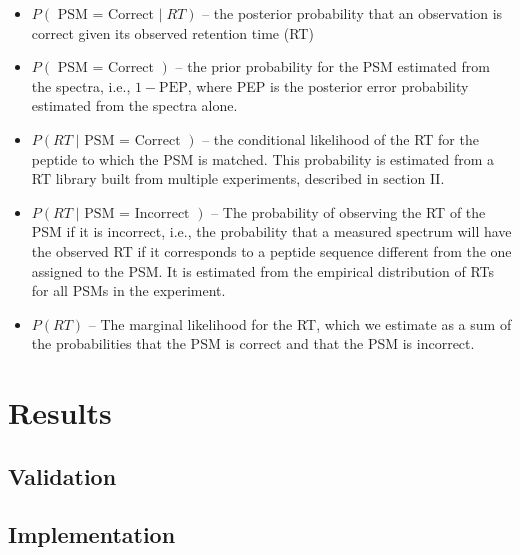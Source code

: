 \begin{spacing}{1.55}
\begin{itemize}
\item $P(\mbox{ PSM = Correct }|\;RT)$ -- the posterior probability that an observation is correct given its observed retention time (RT)
\item $P(\mbox{ PSM = Correct })$ -- the prior probability for the PSM estimated from the spectra, i.e., $1- \mbox{PEP}$, where PEP is the posterior error probability estimated from the spectra alone. 
\item $P(RT\; | \mbox{ PSM = Correct })$ -- the conditional likelihood of the RT for the peptide to which the PSM is matched. This probability is estimated from a RT library built from multiple experiments, described in section II. 
\item $P(RT\; | \mbox{ PSM = Incorrect })$ -- The probability of observing the RT of the PSM if it is incorrect, i.e., the probability that a measured spectrum will have the observed RT if it corresponds to a peptide sequence different from the one assigned to the PSM. It is estimated from the empirical distribution of RTs for all PSMs in the experiment.
\item $P(RT)$ -- The marginal likelihood for the RT, which we estimate as a sum of the probabilities that the PSM is correct and that the PSM is incorrect.
\end{itemize}




\section{Results}

\subsection{Validation}

\subsection{Implementation}


\printbibliography

\end{spacing}
